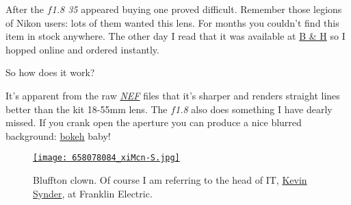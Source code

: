 After the \emph{$f$1.8 35} appeared buying one proved difficult. Remember
those legions of Nikon users: lots of them wanted this lens. For months
you couldn't find this item in stock anywhere. The other day I read that
it was available at \href{http://www.bhphotovideo.com/}{B \& H} so I
hopped online and ordered instantly.

So how does it work?

It's apparent from the raw
\emph{\href{http://filext.com/file-extension/NEF}{NEF}} files that it's
sharper and renders straight lines better than the kit 18-55mm lens. The
\emph{$f$1.8} also does something I have dearly missed. If you crank open
the aperture you can produce a nice blurred background:
\href{http://en.wikipedia.org/wiki/Bokeh}{bokeh} baby!


\begin{figure}[htbp]
\centering
\href{http://conceptcontrol.smugmug.com/Places/USA-and-Canada/Indiana-Images/9710712\_PrYQj\#658078084\_xiMcn}{\texttt{[image: 658078084\_xiMcn-S.jpg]}}
\caption{Bluffton clown. Of course I am referring to the head of IT, \href{http://www.linkedin.com/pub/kevin-snyder/25/345/9a3}{Kevin Synder}, at Franklin Electric. }
\label{fig:88X1}
\end{figure}




%